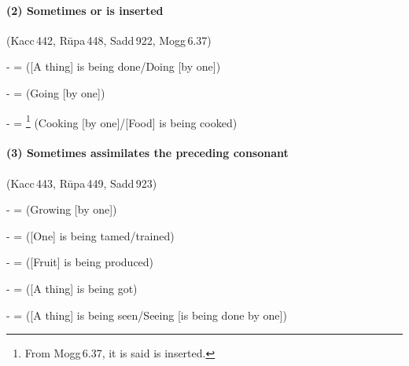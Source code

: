 \paragraph*{(2) Sometimes  or  is inserted} (Kacc\,442, R\=upa\,448, Sadd\,922, Mogg\,6.37)\par
-  =  ([A thing] is being done/Doing [by one])\par
-  =  (Going [by one])\par
-  = \footnote{From Mogg\,6.37, it is said  is inserted.} (Cooking [by one]/[Food] is being cooked)\par

\paragraph*{(3) Sometimes  assimilates the preceding consonant} (Kacc\,443, R\=upa\,449, Sadd\,923)\par
-  =  (Growing [by one])\par
-  =  ([One] is being tamed/trained)\par
-  =  ([Fruit] is being produced)\par
-  =  ([A thing] is being got)\par
-  =  ([A thing] is being seen/Seeing [is being done by one])\par

